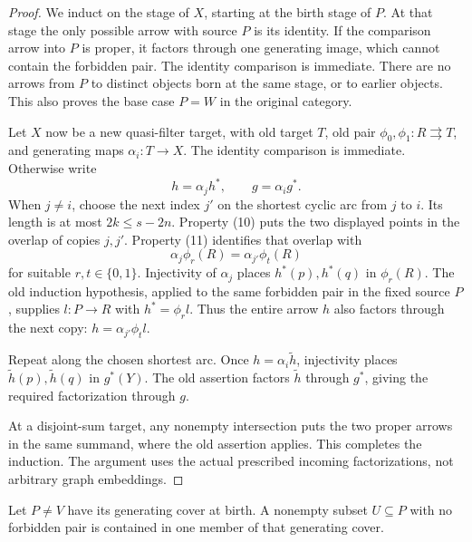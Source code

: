 \begin{proof}
We induct on the stage of $X$, starting at the birth stage of
$P$.  At that stage the only possible arrow with source $P$ is
its identity.  If the comparison arrow into $P$ is proper, it
factors through one generating image, which cannot contain the
forbidden pair.  The identity comparison is immediate.  There
are no arrows from $P$ to distinct objects born at the same stage,
or to earlier objects.  This also proves the base case $P=W$ in
the original category.

Let $X$ now be a new quasi-filter target, with old target $T$,
old pair $\phi_0,\phi_1:R\rightrightarrows T$, and generating maps
$\alpha_i:T\to X$.  The identity comparison is immediate.
Otherwise write
\[
                         h=\alpha_jh^*,\qquad
                         g=\alpha_ig^*.
\]
When $j\ne i$, choose the next index $j'$ on the shortest cyclic
arc from $j$ to $i$.  Its length is at most $2k\leq s-2n$.
Property (10) puts the two displayed points in the overlap of
copies $j,j'$.  Property (11) identifies that overlap with
\[
                       \alpha_j\phi_r(R)
                          =\alpha_{j'}\phi_t(R)
\]
for suitable $r,t\in\{0,1\}$.  Injectivity of $\alpha_j$ places
$h^*(p),h^*(q)$ in $\phi_r(R)$.  The old induction hypothesis,
applied to the same forbidden pair in the fixed source $P$,
supplies $l:P\to R$ with $h^*=\phi_rl$.  Thus the entire arrow
$h$ also factors through the next copy:
$h=\alpha_{j'}\phi_tl$.

Repeat along the chosen shortest arc.  Once $h=\alpha_i\widetilde h$,
injectivity places $\widetilde h(p),\widetilde h(q)$ in $g^*(Y)$.
The old assertion factors $\widetilde h$ through $g^*$, giving
the required factorization through $g$.

At a disjoint-sum target, any nonempty intersection puts the two
proper arrows in the same summand, where the old assertion
applies.  This completes the induction.  The argument uses the
actual prescribed incoming factorizations, not arbitrary graph
embeddings.
\end{proof}

\begin{lemma}
\label{C:birth-cover-helly}
Let $P\ne V$ have its generating cover at birth.  A nonempty
subset $U\subseteq P$ with no forbidden pair is contained in one
member of that generating cover.
\end{lemma}

